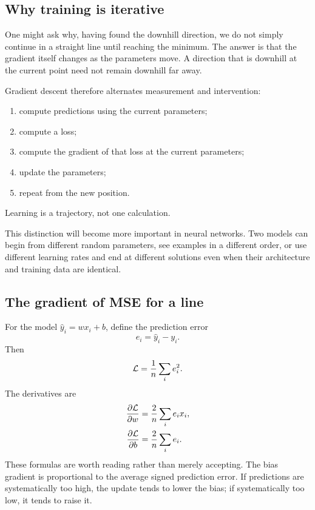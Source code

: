 \subsection{Why training is iterative}

One might ask why, having found the downhill direction, we do not simply continue in a straight line until reaching the minimum. The answer is that the gradient itself changes as the parameters move. A direction that is downhill at the current point need not remain downhill far away.

Gradient descent therefore alternates measurement and intervention:
\begin{enumerate}[leftmargin=*]
  \item compute predictions using the current parameters;
  \item compute a loss;
  \item compute the gradient of that loss at the current parameters;
  \item update the parameters;
  \item repeat from the new position.
\end{enumerate}
Learning is a trajectory, not one calculation.

This distinction will become more important in neural networks. Two models can begin from different random parameters, see examples in a different order, or use different learning rates and end at different solutions even when their architecture and training data are identical.

\subsection{The gradient of MSE for a line}

For the model \(\hat y_i=wx_i+b\), define the prediction error
\[
  e_i = \hat y_i-y_i.
\]
Then
\[
  \mathcal{L}=\frac{1}{n}\sum_i e_i^2.
\]
The derivatives are
\begin{align}
  \frac{\partial\mathcal{L}}{\partial w}
  &=\frac{2}{n}\sum_i e_i x_i,\\
  \frac{\partial\mathcal{L}}{\partial b}
  &=\frac{2}{n}\sum_i e_i.
  \label{eq:week2-line-gradients}
\end{align}
These formulas are worth reading rather than merely accepting. The bias gradient is proportional to the average signed prediction error. If predictions are systematically too high, the update tends to lower the bias; if systematically too low, it tends to raise it.

